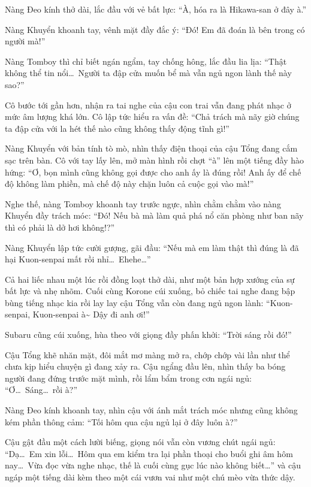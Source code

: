 \documentclass[../main.tex]{subfiles}
\begin{document}
Nàng Đeo kính thở dài, lắc đầu với vẻ bất lực: ``À, hóa ra là Hikawa-san ở đây à.''

Nàng Khuyển khoanh tay, vênh mặt đầy đắc ý: ``Đó! Em đã đoán là bên trong có người mà!''

Nàng Tomboy thì chỉ biết ngán ngẩm, tay chống hông, lắc đầu lia lịa: ``Thật không thể tin nổi\dots\ Người ta đập cửa muốn bể mà vẫn ngủ ngon lành thế này sao?''

Cô bước tới gần hơn, nhận ra tai nghe của cậu con trai vẫn đang phát nhạc ở mức âm lượng khá lớn. Cô lập tức hiểu ra vấn đề: ``Chả trách mà nãy giờ chúng ta đập cửa với la hét thế nào cũng không thấy động tĩnh gì!''

Nàng Khuyển với bản tính tò mò, nhìn thấy điện thoại của cậu Tổng đang cắm sạc trên bàn. Cô với tay lấy lên, mở màn hình rồi chợt ``à'' lên một tiếng đầy hào hứng: ``Ơ, bọn mình cũng không gọi được cho anh ấy là đúng rồi! Anh ấy để chế độ không làm phiền, mà chế độ này chặn luôn cả cuộc gọi vào mà!''

Nghe thế, nàng Tomboy khoanh tay trước ngực, nhìn chằm chằm vào nàng Khuyển đầy trách móc: ``Đó! Nếu bà mà làm quả phá nổ căn phòng như ban nãy thì có phải là dở hơi không!?''

Nàng Khuyển lập tức cười gượng, gãi đầu: ``Nếu mà em làm thật thì đúng là đã hại Kuon-senpai mất rồi nhỉ\dots\ Ehehe\dots''

Cả hai liếc nhau một lúc rồi đồng loạt thở dài, như một bản hợp xướng của sự bất lực và nhẹ nhõm. Cuối cùng Korone cúi xuống, bỏ chiếc tai nghe đang bập bùng tiếng nhạc kia rồi lay lay cậu Tổng vẫn còn đang ngủ ngon lành: ``Kuon-senpai, Kuon-senpai à\~{} Dậy đi anh ơi!''

Subaru cũng cúi xuống, hùa theo với giọng đầy phấn khởi: ``Trời sáng rồi đó!''

Cậu Tổng khẽ nhăn mặt, đôi mắt mơ màng mở ra, chớp chớp vài lần như thể chưa kịp hiểu chuyện gì đang xảy ra. Cậu ngẩng đầu lên, nhìn thấy ba bóng người đang đứng trước mặt mình, rồi lẩm bẩm trong cơn ngái ngủ: ``Ơ\dots\ Sáng\dots\ rồi à?''

Nàng Đeo kính khoanh tay, nhìn cậu với ánh mắt trách móc nhưng cũng không kém phần thông cảm: ``Tối hôm qua cậu ngủ lại ở đây luôn à?''

Cậu gật đầu một cách lười biếng, giọng nói vẫn còn vương chút ngái ngủ: ``Dạ\dots\ Em xin lỗi\dots\ Hôm qua em kiểm tra lại phần thoại cho buổi ghi âm hôm nay\dots\ Vừa đọc vừa nghe nhạc, thế là cuối cùng gục lúc nào không biết\dots'' và cậu ngáp một tiếng dài kèm theo một cái vươn vai như một chú mèo vừa thức dậy.
\end{document}
